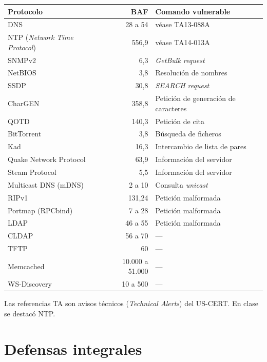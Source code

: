 \documentclass[11pt,a4paper]{report}
\begin{document}
\begin{center}
\small
{\setlength{\aboverulesep}{0pt}\setlength{\belowrulesep}{0pt}\renewcommand{\arraystretch}{1.15}%
\begin{tabular}{l r l}
\toprule
\textbf{Protocolo} & \textbf{BAF} & \textbf{Comando vulnerable} \\
\midrule
DNS & 28 a 54 & véase TA13-088A \\
\rowcolor{yellow!25} NTP (\emph{Network Time Protocol}) & 556,9 & véase TA14-013A \\
SNMPv2 & 6,3 & \emph{GetBulk request} \\
NetBIOS & 3,8 & Resolución de nombres \\
SSDP & 30,8 & \emph{SEARCH request} \\
CharGEN & 358,8 & Petición de generación de caracteres \\
QOTD & 140,3 & Petición de cita \\
BitTorrent & 3,8 & Búsqueda de ficheros \\
Kad & 16,3 & Intercambio de lista de pares \\
Quake Network Protocol & 63,9 & Información del servidor \\
Steam Protocol & 5,5 & Información del servidor \\
Multicast DNS (mDNS) & 2 a 10 & Consulta \emph{unicast} \\
RIPv1 & 131,24 & Petición malformada \\
Portmap (RPCbind) & 7 a 28 & Petición malformada \\
LDAP & 46 a 55 & Petición malformada \\
CLDAP & 56 a 70 & --- \\
TFTP & 60 & --- \\
Memcached & 10.000 a 51.000 & --- \\
WS-Discovery & 10 a 500 & --- \\
\bottomrule
\end{tabular}}
\end{center}
{\small Las referencias TA son avisos técnicos (\emph{Technical Alerts}) del US-CERT. En clase se destacó NTP.}
 
\section{Defensas integrales}
 
\end{document}
